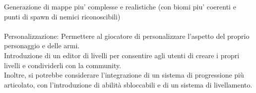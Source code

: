 \documentclass[12pt,a4paper]{report}
\begin{document}
Generazione di mappe piu' complesse e realistiche (con biomi piu' coerenti e punti di spawn di nemici riconoscibili)\\\\


Personalizzazione:
Permettere al giocatore di personalizzare l'aspetto del proprio personaggio e delle armi.\\

Introduzione di un editor di livelli per consentire agli utenti di creare i propri livelli e condividerli con la community.\\

Inoltre, si potrebbe considerare l'integrazione di un sistema di progressione più articolato, con l'introduzione di 
abilità sbloccabili e di un sistema di livellamento.
\end{document}
